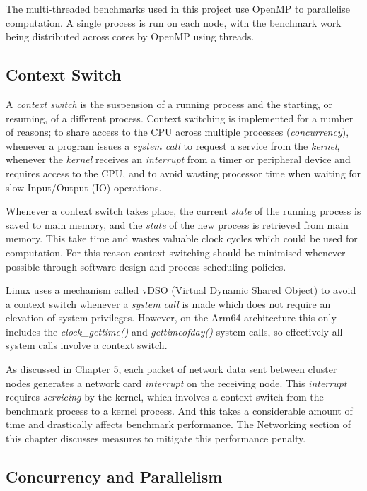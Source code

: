 The multi-threaded benchmarks used in this project use OpenMP to parallelise computation. A single process is run on each node, with the benchmark work being distributed across cores by OpenMP using threads. 


\subsection{Context Switch}

A \emph{context switch} is the suspension of a running process and the starting, or resuming, of a different process. Context switching is implemented for a number of reasons; to share access to the CPU across multiple processes (\emph{concurrency}), whenever a program issues a \emph{system call} to request a service from the \emph{kernel}, whenever the \emph{kernel} receives an \emph{interrupt} from a timer or peripheral device and requires access to the CPU, and to avoid wasting processor time when waiting for slow Input/Output (IO) operations.

Whenever a context switch takes place, the current \emph{state} of the running process is saved to main memory, and the \emph{state} of the new process is retrieved from main memory. This take time and wastes valuable clock cycles which could be used for computation. For this reason context switching should be minimised whenever possible through software design and process scheduling policies.

Linux uses a mechanism called vDSO (Virtual Dynamic Shared Object) to avoid a context switch whenever a \emph{system call} is made which does not require an elevation of system privileges. However, on the Arm64 architecture this only includes the \emph{clock\_gettime()} and \emph{gettimeofday()} system calls, so effectively all system calls involve a context switch.

As discussed in Chapter 5, each packet of network data sent between cluster nodes generates a network card \emph{interrupt} on the receiving node. This \emph{interrupt} requires \emph{servicing} by the kernel, which involves a context switch from the benchmark process to a kernel process. And this takes a considerable amount of time and drastically affects benchmark performance. The Networking section of this chapter discusses measures to mitigate this performance penalty.

\subsection{Concurrency and Parallelism}

